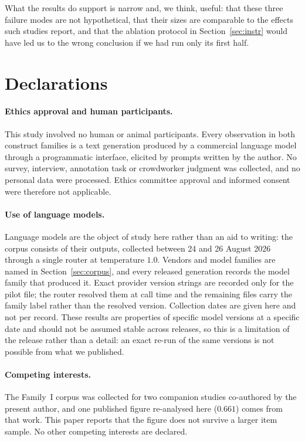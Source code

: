 \documentclass[11pt,letterpaper]{article}
\begin{document}
What the results do support is narrow and, we think, useful: that these three failure modes are
not hypothetical, that their sizes are comparable to the effects such studies report, and that
the ablation protocol in Section~\ref{sec:instr} would have led us to the wrong conclusion if
we had run only its first half.

\section*{Declarations}

\paragraph{Ethics approval and human participants.} This study involved no human or animal
participants. Every observation in both construct families is a text generation produced by a
commercial language model through a programmatic interface, elicited by prompts written by the
author. No survey, interview, annotation task or crowdworker judgment was collected, and no
personal data were processed. Ethics committee approval and informed consent were therefore
not applicable.

\paragraph{Use of language models.} Language models are the object of study here rather than an
aid to writing: the corpus consists of their outputs, collected between 24 and 26 August 2026
through a single router at temperature $1.0$. Vendors and model families are named in
Section~\ref{sec:corpus}, and every released generation records the model family that produced
it. Exact provider version strings are recorded only for the pilot file; the router resolved
them at call time and the remaining files carry the family label rather than the resolved
version. Collection dates are given here and not per record. These results are properties of
specific model versions at a specific date and should not be assumed stable across releases, so
this is a limitation of the release rather than a detail: an exact re-run of the same versions
is not possible from what we published.

\paragraph{Competing interests.} The Family~I corpus was collected for two companion studies
co-authored by the present author, and one published figure re-analysed here ($0.661$) comes
from that work. This paper reports that the figure does not survive a larger item sample. No
other competing interests are declared.
\end{document}
